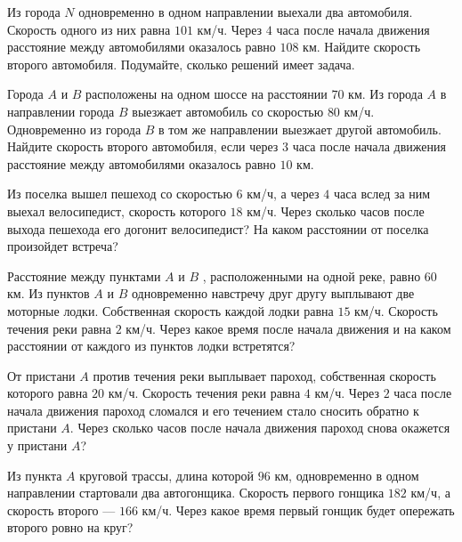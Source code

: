 \begin{consultation}
	\begin{listofex}
	\item Из города \( N \) одновременно в одном направлении выехали два автомобиля. Скорость
	одного из них равна \( 101 \) км/ч. Через \( 4 \) часа после начала движения расстояние между
	автомобилями оказалось равно \( 108 \) км. Найдите скорость второго автомобиля. Подумайте,
	сколько решений имеет задача.
	\item Города \( A \) и \( B \) расположены на одном шоссе на расстоянии \( 70 \) км. Из города \( A \) в направлении города \( B \) выезжает автомобиль со скоростью \( 80 \) км/ч. Одновременно из города \( B \) в том же направлении выезжает другой автомобиль. Найдите скорость второго автомобиля, если через \( 3 \) часа после начала движения расстояние между автомобилями оказалось равно \( 10 \) км.
	\item Из поселка вышел пешеход со скоростью \( 6 \) км/ч, а через \( 4 \) часа вслед за ним выехал велосипедист, скорость которого \( 18 \) км/ч. Через сколько часов после выхода пешехода его догонит велосипедист? На каком расстоянии от поселка произойдет встреча?
	\item Расстояние между пунктами \( A \) и \( B \) , расположенными на одной реке, равно \( 60 \) км. Из пунктов \( A \) и \( B \) одновременно навстречу друг другу выплывают две моторные лодки. Собственная скорость каждой лодки равна \( 15 \) км/ч. Скорость течения реки равна \( 2 \) км/ч. Через какое время после начала движения и на каком расстоянии от каждого из пунктов лодки встретятся?
	\item От пристани \( A \) против течения реки выплывает пароход, собственная скорость которого равна \( 20 \) км/ч. Скорость течения реки равна \( 4 \) км/ч. Через \( 2 \) часа
	после начала движения пароход сломался и его течением стало сносить обратно к пристани \( A \).
	Через сколько часов после начала движения пароход снова окажется у пристани \( A \)?
	\item Из пункта \( A \) круговой трассы, длина которой \( 96 \) км, одновременно в одном направлении стартовали два автогонщика. Скорость первого гонщика \( 182 \) км/ч, а скорость
	второго --- \( 166 \) км/ч. Через какое время первый гонщик будет опережать второго ровно на круг?
\end{listofex}
\end{consultation}

